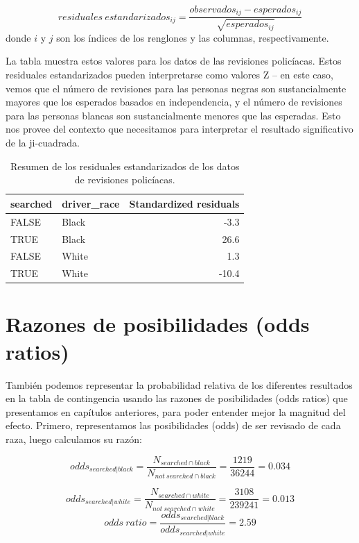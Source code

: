 \documentclass[
  12pt,
]{book}
\begin{document}
\[
residuales\ estandarizados_{ij} = \frac{observados_{ij} - esperados_{ij}}{\sqrt{esperados_{ij}}}
\]
donde \(i\) y \(j\) son los índices de los renglones y las columnas, respectivamente.

La tabla muestra estos valores para los datos de las revisiones policíacas. Estos residuales estandarizados pueden interpretarse como valores Z -- en este caso, vemos que el número de revisiones para las personas negras son sustancialmente mayores que los esperados basados en independencia, y el número de revisiones para las personas blancas son sustancialmente menores que las esperadas. Esto nos provee del contexto que necesitamos para interpretar el resultado significativo de la ji-cuadrada.

\begin{table}

\caption{\label{tab:unnamed-chunk-82}Resumen de los residuales estandarizados de los datos de revisiones policíacas.}
\centering
\begin{tabular}[t]{l|l|r}
\hline
searched & driver\_race & Standardized residuals\\
\hline
FALSE & Black & -3.3\\
\hline
TRUE & Black & 26.6\\
\hline
FALSE & White & 1.3\\
\hline
TRUE & White & -10.4\\
\hline
\end{tabular}
\end{table}

\hypertarget{razones-de-posibilidades-odds-ratios}{%
\section{Razones de posibilidades (odds ratios)}\label{razones-de-posibilidades-odds-ratios}}

También podemos representar la probabilidad relativa de los diferentes resultados en la tabla de contingencia usando las razones de posibilidades (odds ratios) que presentamos en capítulos anteriores, para poder entender mejor la magnitud del efecto. Primero, representamos las posibilidades (odds) de ser revisado de cada raza, luego calculamos su razón:

\[
odds_{searched|black} = \frac{N_{searched\cap black}}{N_{not\ searched\cap black}} = \frac{1219}{36244} = 0.034
\]

\[
odds_{searched|white} = \frac{N_{searched\cap white}}{N_{not\ searched\cap white}} = \frac{3108}{239241} = 0.013
\]
\[
odds\ ratio = \frac{odds_{searched|black}}{odds_{searched|white}} = 2.59
\]
\end{document}
